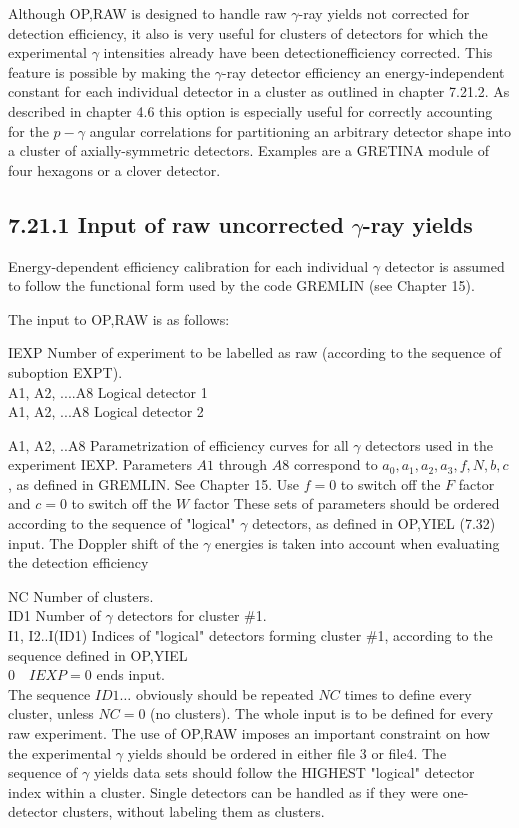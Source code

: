 \documentclass[10pt]{article}
\begin{document}
Although OP,RAW is designed to handle raw $\gamma$-ray yields not corrected for detection efficiency, it also is very useful for clusters of detectors for which the experimental $\gamma$ intensities already have been detectionefficiency corrected. This feature is possible by making the $\gamma$-ray detector efficiency an energy-independent constant for each individual detector in a cluster as outlined in chapter 7.21.2. As described in chapter 4.6 this option is especially useful for correctly accounting for the $p-\gamma$ angular correlations for partitioning an arbitrary detector shape into a cluster of axially-symmetric detectors. Examples are a GRETINA module of four hexagons or a clover detector.

\subsection*{7.21.1 Input of raw uncorrected $\gamma$-ray yields}
Energy-dependent efficiency calibration for each individual $\gamma$ detector is assumed to follow the functional form used by the code GREMLIN (see Chapter 15).

The input to OP,RAW is as follows:

IEXP Number of experiment to be labelled as raw (according to the sequence of suboption EXPT).\\
A1, A2, ....A8 Logical detector 1\\
A1, A2, ...A8 Logical detector 2

A1, A2, ..A8 Parametrization of efficiency curves for all $\gamma$ detectors used in the experiment IEXP. Parameters $A 1$ through $A 8$ correspond to $a_{0}, a_{1}, a_{2}, a_{3}, f, N, b, c$, as defined in GREMLIN. See Chapter 15. Use $f=0$ to switch off the $F$ factor and $c=0$ to switch off the $W$ factor These sets of parameters should be ordered according to the sequence of "logical" $\gamma$ detectors, as defined in OP,YIEL (7.32) input. The Doppler shift of the $\gamma$ energies is taken into account when evaluating the detection efficiency

NC Number of clusters.\\
ID1 Number of $\gamma$ detectors for cluster \#1.\\
I1, I2..I(ID1) Indices of "logical" detectors forming cluster \#1, according to the sequence defined in OP,YIEL\\
$0 \quad I E X P=0$ ends input.\\
The sequence $I D 1 \ldots$ obviously should be repeated $N C$ times to define every cluster, unless $N C=0$ (no clusters). The whole input is to be defined for every raw experiment. The use of OP,RAW imposes an important constraint on how the experimental $\gamma$ yields should be ordered in either file 3 or file4. The\\
sequence of $\gamma$ yields data sets should follow the HIGHEST "logical" detector index within a cluster. Single detectors can be handled as if they were one-detector clusters, without labeling them as clusters.
\end{document}
